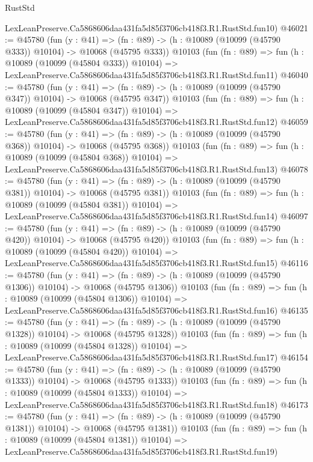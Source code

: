 \begin{lexlean}{RustStd}
\begin{coremodule}
    LexLeanPreserve.Ca5868606daa431fa5d85f3706cb418f3.R1.RustStd.fun10)
@46021 := @45780
    (fun (y : @41) =>
    (fn : @89) -> (h : @10089 (@10099 (@45790 @333)) @10104) -> @10068 (@45795 @333))
    @10103
    (fun (fn : @89) =>
    fun (h : @10089 (@10099 (@45804 @333)) @10104) =>
    LexLeanPreserve.Ca5868606daa431fa5d85f3706cb418f3.R1.RustStd.fun11)
@46040 := @45780
    (fun (y : @41) =>
    (fn : @89) -> (h : @10089 (@10099 (@45790 @347)) @10104) -> @10068 (@45795 @347))
    @10103
    (fun (fn : @89) =>
    fun (h : @10089 (@10099 (@45804 @347)) @10104) =>
    LexLeanPreserve.Ca5868606daa431fa5d85f3706cb418f3.R1.RustStd.fun12)
@46059 := @45780
    (fun (y : @41) =>
    (fn : @89) -> (h : @10089 (@10099 (@45790 @368)) @10104) -> @10068 (@45795 @368))
    @10103
    (fun (fn : @89) =>
    fun (h : @10089 (@10099 (@45804 @368)) @10104) =>
    LexLeanPreserve.Ca5868606daa431fa5d85f3706cb418f3.R1.RustStd.fun13)
@46078 := @45780
    (fun (y : @41) =>
    (fn : @89) -> (h : @10089 (@10099 (@45790 @381)) @10104) -> @10068 (@45795 @381))
    @10103
    (fun (fn : @89) =>
    fun (h : @10089 (@10099 (@45804 @381)) @10104) =>
    LexLeanPreserve.Ca5868606daa431fa5d85f3706cb418f3.R1.RustStd.fun14)
@46097 := @45780
    (fun (y : @41) =>
    (fn : @89) -> (h : @10089 (@10099 (@45790 @420)) @10104) -> @10068 (@45795 @420))
    @10103
    (fun (fn : @89) =>
    fun (h : @10089 (@10099 (@45804 @420)) @10104) =>
    LexLeanPreserve.Ca5868606daa431fa5d85f3706cb418f3.R1.RustStd.fun15)
@46116 := @45780
    (fun (y : @41) =>
    (fn : @89) -> (h : @10089 (@10099 (@45790 @1306)) @10104) -> @10068 (@45795 @1306))
    @10103
    (fun (fn : @89) =>
    fun (h : @10089 (@10099 (@45804 @1306)) @10104) =>
    LexLeanPreserve.Ca5868606daa431fa5d85f3706cb418f3.R1.RustStd.fun16)
@46135 := @45780
    (fun (y : @41) =>
    (fn : @89) -> (h : @10089 (@10099 (@45790 @1328)) @10104) -> @10068 (@45795 @1328))
    @10103
    (fun (fn : @89) =>
    fun (h : @10089 (@10099 (@45804 @1328)) @10104) =>
    LexLeanPreserve.Ca5868606daa431fa5d85f3706cb418f3.R1.RustStd.fun17)
@46154 := @45780
    (fun (y : @41) =>
    (fn : @89) -> (h : @10089 (@10099 (@45790 @1333)) @10104) -> @10068 (@45795 @1333))
    @10103
    (fun (fn : @89) =>
    fun (h : @10089 (@10099 (@45804 @1333)) @10104) =>
    LexLeanPreserve.Ca5868606daa431fa5d85f3706cb418f3.R1.RustStd.fun18)
@46173 := @45780
    (fun (y : @41) =>
    (fn : @89) -> (h : @10089 (@10099 (@45790 @1381)) @10104) -> @10068 (@45795 @1381))
    @10103
    (fun (fn : @89) =>
    fun (h : @10089 (@10099 (@45804 @1381)) @10104) =>
    LexLeanPreserve.Ca5868606daa431fa5d85f3706cb418f3.R1.RustStd.fun19)

\end{coremodule}
\end{lexlean}
